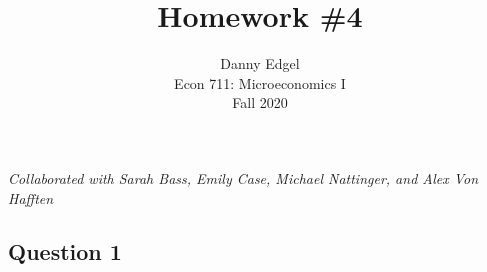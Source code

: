 \documentclass{article}
\begin{document}
\title{	Homework \#4 }
\author{ 	Danny Edgel 					\\ 
			Econ 711: Microeconomics I		\\
			Fall 2020						\\
		}
\maketitle\thispagestyle{empty}

\noindent\textit{Collaborated with Sarah Bass, Emily Case, Michael Nattinger, and Alex Von Hafften}


\subsection*{Question 1}
\end{document}
